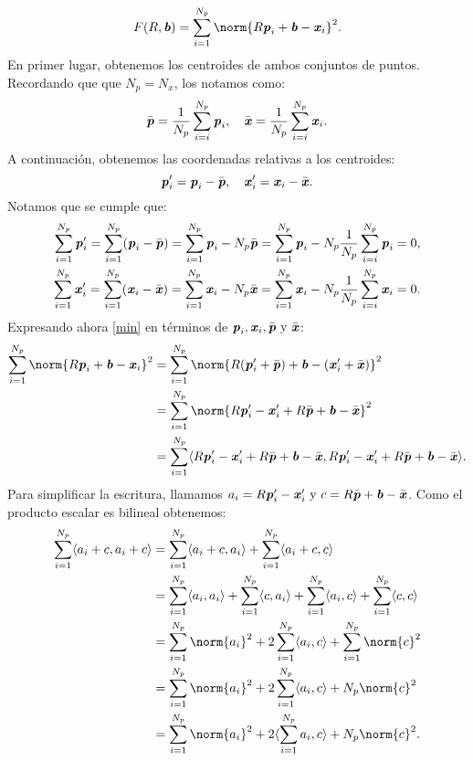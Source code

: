 		\begin{equation}\label{min}
		F (R,\bb) = \sum_{i = 1}^{N_p} \norm{R\pp_i + \bb - \xx_i}^2.
		\end{equation}
		En primer lugar, obtenemos los centroides de ambos conjuntos de puntos. Recordando que que $ N_p = N_x $, los notamos como:
		\[
		\bar{\textbf{\emph{p}}} = \frac{1}{N_p} \sum_{i=i}^{N_p} \textbf{\emph{p}}_i,  \quad \bar{\textbf{\emph{x}}} = \frac{1}{N_p} \sum_{i=i}^{N_p} \textbf{\emph{x}}_i.
		\]
		A continuación, obtenemos las coordenadas relativas a los centroides:
		\[
		\textbf{\emph{p}}_i' = \textbf{\emph{p}}_i - \bar{\textbf{\emph{p}}}, \quad \textbf{\emph{x}}_i' = \textbf{\emph{x}}_i - \bar{\textbf{\emph{x}}}.
		\]
		Notamos que se cumple que:
		\begin{equation}\label{cen0}
		\begin{split}
			\sum_{i=1}^{N_p} \textbf{\emph{p}}_i' = \sum_{i=1}^{N_p} (\textbf{\emph{p}}_i - \bar{\textbf{\emph{p}}}) = \sum_{i=1}^{N_p} \textbf{\emph{p}}_i - N_p\bar{\textbf{\emph{p}}} = \sum_{i=1}^{N_p} \textbf{\emph{p}}_i - N_p\frac{1}{N_p} \sum_{i=i}^{N_p} \textbf{\emph{p}}_i = 0, \\
			\sum_{i=1}^{N_p} \textbf{\emph{x}}_i' = \sum_{i=1}^{N_p} (\textbf{\emph{x}}_i - \bar{\textbf{\emph{x}}}) = \sum_{i=1}^{N_p} \textbf{\emph{x}}_i - N_p\bar{\textbf{\emph{x}}} = \sum_{i=1}^{N_p} \textbf{\emph{x}}_i - N_p\frac{1}{N_p} \sum_{i=i}^{N_p} \textbf{\emph{x}} _i = 0. 
		\end{split}
		\end{equation}		
		Expresando ahora \eqref{min} en términos de $ \textbf{\emph{p}}_i, \textbf{\emph{x}}_i, \bar{\textbf{\emph{p}}} \text{ y } \bar{\textbf{\emph{x}}}$:
		\begin{equation*}
		\begin{split}
		\sum_{i = 1}^{N_p} \norm{R\pp_i + \bb - \xx_i}^2 &= \sum_{i = 1}^{N_p} \norm{R(\pp_i' + \bar{\pp} ) + \bb - (\xx_i' + \bar{\xx})}^2 \\
		&=\sum_{i = 1}^{N_p} \norm{R\pp_i' -\xx_i' + R\bar{\pp}  + \bb - \bar{\xx}}^2 \\
		&= \sum_{i = 1}^{N_p} \langle R\pp_i' -\xx_i' + R\bar{\pp}  + \bb - \bar{\xx}, R\pp_i' -\xx_i' + R\bar{\pp}  + \bb - \bar{\xx} \rangle.
		\end{split}
		\end{equation*} 
		Para simplificar la escritura, llamamos $ a_i = R\textbf{\emph{p}}_i' -\textbf{\emph{x}}_i' \text{ y } c = R\bar{\textbf{\emph{p}}}  + \textbf{\emph{b}} - \bar{\textbf{\emph{x}}}$. Como el producto escalar es bilineal obtenemos: 
		\begin{equation*}
		\begin{split}
		\sum_{i = 1}^{N_p} \langle a_i + c, a_i + c\rangle &= \sum_{i = 1}^{N_p} \langle a_i + c, a_i \rangle + \sum_{i = 1}^{N_p} \langle a_i + c, c\rangle\\ 
		& = \sum_{i = 1}^{N_p} \langle a_i, a_i \rangle + \sum_{i = 1}^{N_p} \langle c, a_i\rangle + \sum_{i = 1}^{N_p} \langle a_i, c \rangle + \sum_{i = 1}^{N_p} \langle c, c\rangle \\
		& = \sum_{i = 1}^{N_p} \norm{a_i}^2 + 2\sum_{i = 1}^{N_p} \langle a_i, c\rangle + \sum_{i = 1}^{N_p} \norm{c}^2 \\
		& = \sum_{i = 1}^{N_p} \norm{a_i}^2 + 2\sum_{i = 1}^{N_p} \langle a_i, c\rangle + N_p \norm{c}^2 \\
		& = \sum_{i = 1}^{N_p} \norm{a_i}^2 + 2 \langle \sum_{i = 1}^{N_p} a_i, c\rangle + N_p \norm{c}^2.
		\end{split}
		\end{equation*} 
